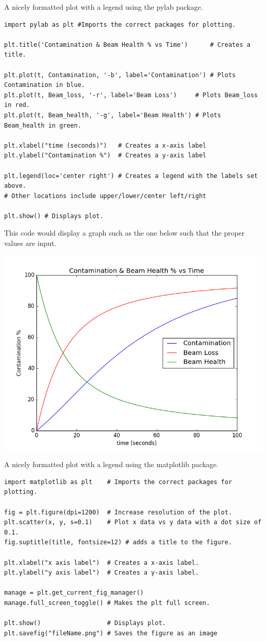A nicely formatted plot with a legend using the pylab package.
\begin{lstlisting}
import pylab as plt #Imports the correct packages for plotting.

plt.title('Contamination & Beam Health % vs Time')      # Creates a title.

plt.plot(t, Contamination, '-b', label='Contamination') # Plots Contamination in blue.
plt.plot(t, Beam_loss, '-r', label='Beam Loss')     # Plots Beam_loss in red.
plt.plot(t, Beam_health, '-g', label='Beam Health') # Plots Beam_health in green.

plt.xlabel("time (seconds)")   # Creates a x-axis label
plt.ylabel("Contamination %")  # Creates a y-axis label

plt.legend(loc='center right') # Creates a legend with the labels set above.
# Other locations include upper/lower/center left/right

plt.show() # Displays plot.
\end{lstlisting}
This code would display a graph such as the one below such that the proper values are input.

\includegraphics[width=0.5\linewidth]{./Images/Figures/figure_1-4}

A nicely formatted plot with a legend using the matplotlib package.
\begin{lstlisting}
import matplotlib as plt    # Imports the correct packages for plotting.

fig = plt.figure(dpi=1200)  # Increase resolution of the plot.
plt.scatter(x, y, s=0.1)    # Plot x data vs y data with a dot size of 0.1.
fig.suptitle(title, fontsize=12) # adds a title to the figure.

plt.xlabel("x axis label")  # Creates a x-axis label.
plt.ylabel("y axis label")  # Creates a y-axis label.

manage = plt.get_current_fig_manager()
manage.full_screen_toggle() # Makes the plt full screen.

plt.show()                  # Displays plot.
plt.savefig("fileName.png") # Saves the figure as an image
\end{lstlisting}






























